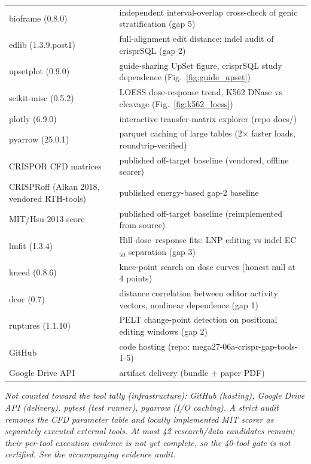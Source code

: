\begin{longtable}{@{}p{}p{}@{}}
bioframe (0.8.0) & independent interval-overlap cross-check of genic stratification (gap 5) \\
edlib (1.3.9.post1) & full-alignment edit distance; indel audit of crisprSQL (gap 2) \\
upsetplot (0.9.0) & guide-sharing UpSet figure, crisprSQL study dependence (Fig.~\ref{fig:guide_upset}) \\
scikit-misc (0.5.2) & LOESS dose-response trend, K562 DNase vs cleavage (Fig.~\ref{fig:k562_loess}) \\
plotly (6.9.0) & interactive transfer-matrix explorer (repo docs/) \\
pyarrow (25.0.1) & parquet caching of large tables (2$\times$ faster loads, roundtrip-verified) \\
CRISPOR CFD matrices & published off-target baseline (vendored, offline scorer) \\
CRISPRoff (Alkan 2018, vendored RTH-tools) & published energy-based gap-2 baseline \\
MIT/Hsu-2013 score & published off-target baseline (reimplemented from source) \\
lmfit (1.3.4) & Hill dose--response fits: LNP editing vs indel EC$_{50}$ separation (gap 3) \\
kneed (0.8.6) & knee-point search on dose curves (honest null at 4 points) \\
dcor (0.7) & distance correlation between editor activity vectors, nonlinear dependence (gap 1) \\
ruptures (1.1.10) & PELT change-point detection on positional editing windows (gap 2) \\
GitHub & code hosting (repo: mega27-06a-crispr-gap-tools-1-5) \\
Google Drive API & artifact delivery (bundle + paper PDF) \\
\hline
\end{longtable}\endgroup

\noindent \emph{Not counted toward the tool tally (infrastructure):
GitHub (hosting), Google Drive API (delivery), pytest (test runner),
pyarrow (I/O caching). A strict audit removes the CFD parameter table and locally implemented MIT scorer as separately executed external tools. At most 42 research/data candidates remain; their per-tool execution evidence is not yet complete, so the 40-tool gate is not certified. See the accompanying evidence audit.}

